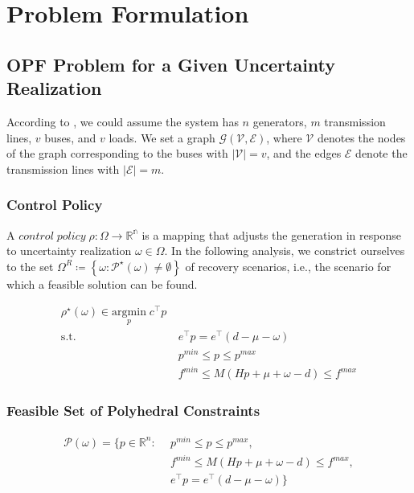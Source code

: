 \documentclass[11pt]{article}
\begin{document}
\section{Problem Formulation}\label{sec:problem}
\subsection{OPF Problem for a Given Uncertainty Realization}
According to \cite{1802.09639}, we could assume the system has $n$ generators, $m$ transmission lines, $v$ buses, and $v$ loads. We set a graph $\mathcal{G}( \mathcal{V}, \mathcal{E})$, where $\mathcal{V}$ denotes the nodes of the graph corresponding to the buses with $\left| \mathcal{V} \right| = v$, and the edges $\mathcal{E}$ denote the transmission lines with $\left| \mathcal{E} \right| = m$.

\subsubsection{Control Policy}
A $control \; policy \; \rho : \Omega\rightarrow \mathbb{R^{n}}$ is a mapping that adjusts the generation in response to uncertainty realization $\omega \in \Omega$. In the following analysis, we constrict ourselves to the set $\Omega^{R}\coloneqq\left \{ \omega:\mathcal{P}^{\star} \left ( \omega \right )\neq \emptyset \right \}$ of recovery scenarios, i.e., the scenario for which a feasible solution can be found.

\begin{align}\label{eq:opf}
\rho^{\star}\left (  \omega \right )\in \underset{p}{\mathrm{argmin}} \; c^{\top }p \\
\textrm{s.t.} ~ &~ e^{\top }p=e^{\top }\left ( d-\mu -\omega  \right ) \\
~&~ p^{min}\leq p\leq p^{max} \\
~&~ f^{min}\leq M\left ( Hp+\mu +\omega -d \right )  \leq f^{max}
\end{align}

\subsubsection{Feasible Set of Polyhedral Constraints}
\begin{align}\label{eq:opf_poly}
\mathcal{P}\left ( \omega \right ) =  \{ p\in\mathbb{R}^{n}:
~ &~p^{min}\leq p\leq p^{max}, \nonumber \\
~ &~ f^{min}\leq M\left ( Hp+\mu +\omega -d \right )  \leq f^{max}, \nonumber \\
~ &~ e^{\top }p=e^{\top }\left ( d-\mu -\omega  \right )  \}
\end{align}
\end{document}
